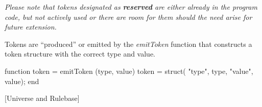 \textit{Please note that tokens designated as \textbf{reserved} are either already in the program code, but not actively used or there are room for them should the need arise for future extension.}

Tokens are ``produced'' or emitted by the \textit{emitToken}  function that constructs a token structure with the correct type and value.

\begin{octave}
function token = emitToken (type, value)
  token = struct(
  "type", type,
  "value", value);
end
\end{octave}

[Universe and Rulebase]